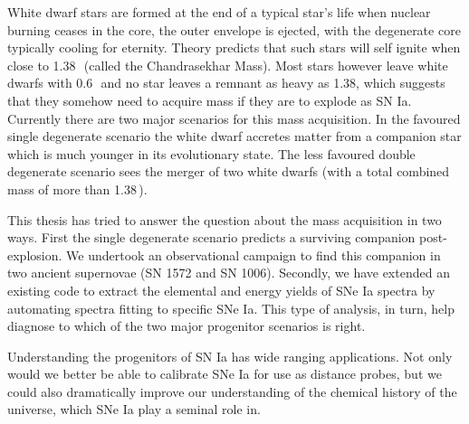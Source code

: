 White dwarf stars are formed at the end of a typical star's life when nuclear burning ceases in the core, the outer envelope is ejected, with the degenerate core typically cooling for eternity. Theory predicts that such stars will self ignite when close to 1.38\,\msun\ (called the Chandrasekhar Mass). Most stars however leave white dwarfs with 0.6\,\msun\, and no star leaves a remnant as heavy as 1.38\msun,  which suggests that they somehow need to acquire mass if they are to explode as SN Ia. Currently there are two major scenarios for this mass acquisition. In the favoured single degenerate scenario the white dwarf accretes matter from a companion star which is much younger in its evolutionary state. The less favoured double degenerate scenario sees the merger of two white dwarfs (with a total combined mass of more than 1.38\,\msun). 

This thesis has tried to answer the question about the mass acquisition in two ways. First the single degenerate scenario predicts a surviving companion post-explosion. We undertook an observational campaign to find this companion in two ancient supernovae (SN 1572 and SN 1006). Secondly, we have extended an existing code to extract the elemental and energy yields of SNe Ia spectra by automating spectra fitting to specific SNe Ia. This type of analysis, in turn, help diagnose to which of the two major progenitor scenarios is right. 

Understanding the progenitors of SN Ia has wide ranging applications. Not only would we better be able to calibrate SNe Ia for use as distance probes, but we could also dramatically improve our understanding of the chemical history of the universe, which SNe Ia play a seminal role in.






